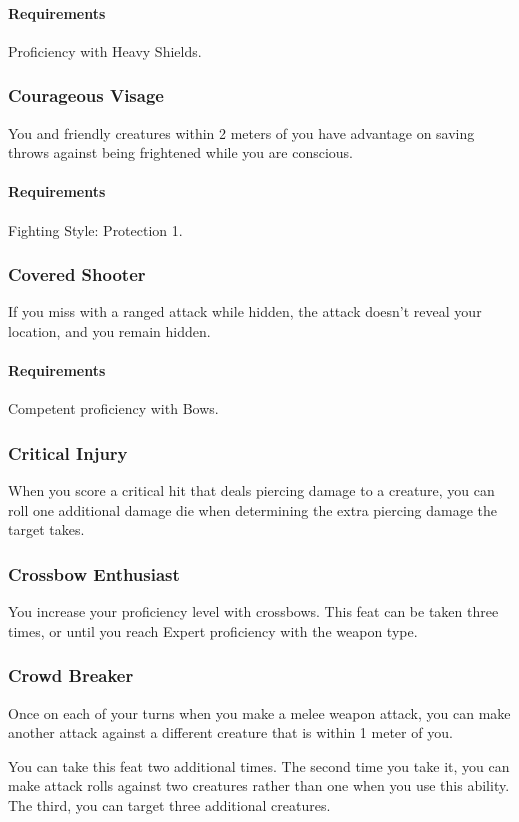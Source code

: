     \paragraph{Requirements} Proficiency with Heavy Shields.
\subsubsection{Courageous Visage} \label{feat::courageousvisage}
    You and friendly creatures within 2 meters of you have advantage on saving throws against being frightened while you are conscious.
    \paragraph{Requirements} Fighting Style: Protection 1.
\subsubsection{Covered Shooter} \label{feat::coveredshooter}
    If you miss with a ranged attack while hidden, the attack doesn't reveal your location, and you remain hidden.
    \paragraph{Requirements} Competent proficiency with Bows.
\subsubsection{Critical Injury} \label{feat::criticalinjury}
    When you score a critical hit that deals piercing damage to a creature, you can roll one additional damage die when determining the extra piercing damage the target takes.
\subsubsection{Crossbow Enthusiast} \label{feat::crossbowenthusiast}
    You increase your proficiency level with crossbows.
    This feat can be taken three times, or until you reach Expert proficiency with the weapon type.
\subsubsection{Crowd Breaker} \label{feat::crowdbreaker}
    Once on each of your turns when you make a melee weapon attack, you can make another attack against a different creature that is within 1 meter of you.

    You can take this feat two additional times.
    The second time you take it, you can make attack rolls against two creatures rather than one when you use this ability.
    The third, you can target three additional creatures.
